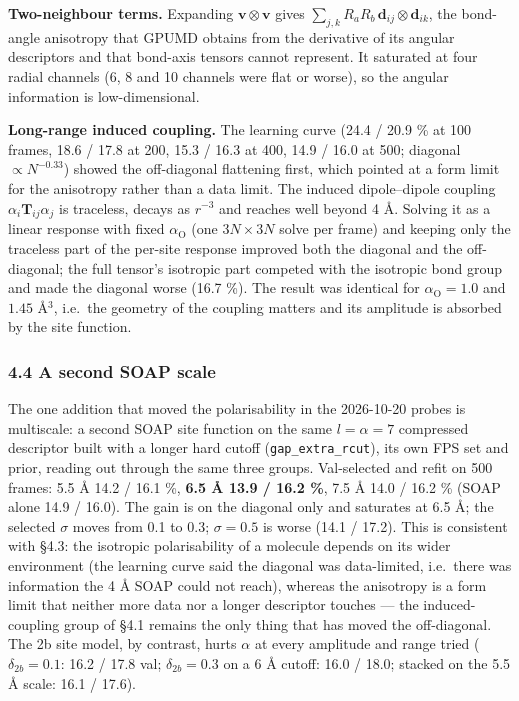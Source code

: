 \documentclass[
  10pt,
]{article}
\begin{document}
\textbf{Two-neighbour terms.} Expanding \(\mathbf v\otimes\mathbf v\) gives
\(\sum_{j,k}R_aR_b\,\mathbf d_{ij}\otimes\mathbf d_{ik}\), the bond-angle anisotropy that GPUMD
obtains from the derivative of its angular descriptors and that bond-axis tensors cannot represent.
It saturated at four radial channels (6, 8 and 10 channels were flat or worse), so the angular
information is low-dimensional.

\textbf{Long-range induced coupling.} The learning curve (24.4 / 20.9 \% at 100 frames, 18.6 / 17.8
at 200, 15.3 / 16.3 at 400, 14.9 / 16.0 at 500; diagonal \(\propto N^{-0.33}\)) showed the
off-diagonal flattening first, which pointed at a form limit for the anisotropy rather than a data
limit. The induced dipole--dipole coupling \(\alpha_i\mathbf T_{ij}\alpha_j\) is traceless, decays
as \(r^{-3}\) and reaches well beyond 4 \AA{}. Solving it as a linear response with fixed
\(\alpha_\mathrm O\) (one \(3N\times3N\) solve per frame) and keeping only the traceless part of the
per-site response improved both the diagonal and the off-diagonal; the full tensor's isotropic part
competed with the isotropic bond group and made the diagonal worse (16.7 \%). The result was
identical for \(\alpha_\mathrm O = 1.0\) and \(1.45\) \AA{}\(^3\), i.e.~the geometry of the coupling
matters and its amplitude is absorbed by the site function.

\subsubsection{4.4 A second SOAP scale}\label{a-second-soap-scale}

The one addition that moved the polarisability in the 2026-10-20 probes is multiscale: a second SOAP
site function on the same \(l=\alpha=7\) compressed descriptor built with a longer hard cutoff
(\texttt{gap\_extra\_rcut}), its own FPS set and prior, reading out through the same three groups.
Val-selected and refit on 500 frames: 5.5 \AA{} 14.2 / 16.1 \%, \textbf{6.5 \AA{} 13.9 / 16.2 \%},
7.5 \AA{} 14.0 / 16.2 \% (SOAP alone 14.9 / 16.0). The gain is on the diagonal only and saturates at
6.5 \AA{}; the selected \(\sigma\) moves from 0.1 to 0.3; \(\sigma=0.5\) is worse (14.1 / 17.2).
This is consistent with §4.3: the isotropic polarisability of a molecule depends on its wider
environment (the learning curve said the diagonal was data-limited, i.e.~there was information the 4
\AA{} SOAP could not reach), whereas the anisotropy is a form limit that neither more data nor a
longer descriptor touches --- the induced-coupling group of §4.1 remains the only thing that has
moved the off-diagonal. The 2b site model, by contrast, hurts \(\alpha\) at every amplitude and
range tried (\(\delta_{2b}=0.1\): 16.2 / 17.8 val; \(\delta_{2b}=0.3\) on a 6 \AA{} cutoff: 16.0 /
18.0; stacked on the 5.5 \AA{} scale: 16.1 / 17.6).
\end{document}
